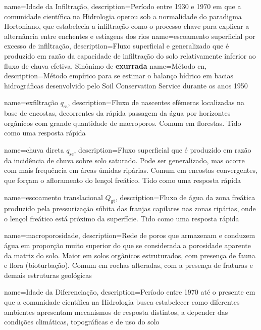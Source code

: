{
    name=Idade da Infiltração,
    description={Período entre 1930 e 1970 em que a comunidade científica na Hidrologia operou sob a normalidade do paradigma Hortoniano, que estabelecia a infiltração como o processo chave para explicar a alternância entre enchentes e estiagens dos rios}
}
{
    name=escoamento superficial por excesso de infiltração,
    description={Fluxo superficial e generalizado que é produzido em razão da capacidade de infiltração do solo relativamente inferior ao fluxo de chuva efetiva. Sinônimo de \textbf{exurrada}}
}
{
    name=Método \acrfull{cn},
    description={Método empírico para se estimar o balanço hídrico em bacias hidrográficas desenvolvido pelo Soil Conservation Service durante os anos 1950}
}

{
    name=exfiltração $q_{\text{ss}}$,
    description={Fluxo de nascentes efêmeras localizadas na base de encostas, decorrentes da rápida passagem da água por horizontes orgânicos com grande quantidade de macroporos. Comum em florestas. Tido como uma resposta rápida}
}

{
    name=chuva direta $q_{\text{se}}$,
    description={Fluxo superficial que é produzido em razão da incidência de chuva sobre solo saturado. Pode ser generalizado, mas ocorre com mais frequência em áreas úmidas ripárias. Comum em encostas convergentes, que forçam o afloramento do lençol freático. Tido como uma resposta rápida}
}

{
    name=escoamento translacional $Q_{\text{gt}}$,
    description={Fluxo de água da zona freática produzido pela pressurização súbita das franjas capilares nas zonas ripárias, onde o lençol freático está próximo da superfície. Tido como uma resposta rápida}
}

{
    name=macroporosidade,
    description={Rede de poros que armazenam e conduzem água em proporção muito superior do que se considerada a porosidade aparente da matriz do solo. Maior em solos orgânicos estruturados, com presença de fauna e flora (bioturbação). Comum em rochas alteradas, com a presença de fraturas e demais estruturas geológicas}
}

{
    name=Idade da Diferenciação,
    description={Período entre 1970 até o presente em que a comunidade científica na Hidrologia busca estabelecer como diferentes ambientes apresentam mecanismos de resposta distintos, a depender das condições climáticas, topográficas e de uso do solo}
}

